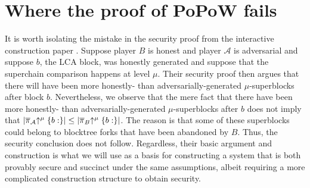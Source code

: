 \section{Where the proof of PoPoW fails}
It is worth isolating the mistake in the security proof from
the interactive construction paper \cite{KLS}. Suppose player $B$ is honest and
player $\mathcal{A}$ is adversarial and suppose $b$, the LCA block, was honestly
generated and suppose that the superchain comparison happens at level $\mu$.
Their security proof then argues that there will have been more honestly- than
adversarially-generated $\mu$-superblocks after block $b$. Nevertheless, we
observe that the mere fact that there have been more honestly- than
adversarially-generated $\mu$-superblocks after $b$ does not imply that
$|\overline\pi_\mathcal{A}\negthickspace\uparrow^\mu\{b:\}| \leq |\overline\pi_B\negthickspace\uparrow^\mu\{b:\}|$. The
reason is that some of these superblocks could belong to blocktree forks that
have been abandoned by $B$. Thus, the security conclusion does not follow.
Regardless, their basic argument and construction is what we will use as a basis
for constructing a system that is both provably secure and succinct under the
same assumptions, albeit requiring a more complicated construction structure to
obtain security.
